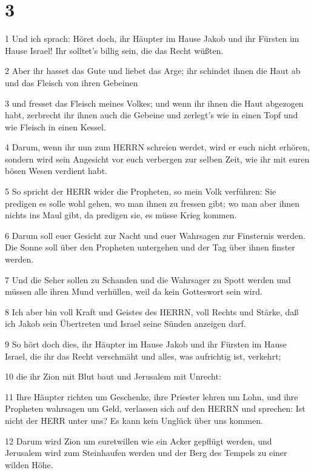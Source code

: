 \chapter{3}

\par 1 Und ich sprach: Höret doch, ihr Häupter im Hause Jakob und ihr Fürsten im Hause Israel! Ihr solltet's billig sein, die das Recht wüßten.
\par 2 Aber ihr hasset das Gute und liebet das Arge; ihr schindet ihnen die Haut ab und das Fleisch von ihren Gebeinen
\par 3 und fresset das Fleisch meines Volkes; und wenn ihr ihnen die Haut abgezogen habt, zerbrecht ihr ihnen auch die Gebeine und zerlegt's wie in einen Topf und wie Fleisch in einen Kessel.
\par 4 Darum, wenn ihr nun zum HERRN schreien werdet, wird er euch nicht erhören, sondern wird sein Angesicht vor euch verbergen zur selben Zeit, wie ihr mit euren bösen Wesen verdient habt.
\par 5 So spricht der HERR wider die Propheten, so mein Volk verführen: Sie predigen es solle wohl gehen, wo man ihnen zu fressen gibt; wo man aber ihnen nichts ins Maul gibt, da predigen sie, es müsse Krieg kommen.
\par 6 Darum soll euer Gesicht zur Nacht und euer Wahrsagen zur Finsternis werden. Die Sonne soll über den Propheten untergehen und der Tag über ihnen finster werden.
\par 7 Und die Seher sollen zu Schanden und die Wahrsager zu Spott werden und müssen alle ihren Mund verhüllen, weil da kein Gotteswort sein wird.
\par 8 Ich aber bin voll Kraft und Geistes des HERRN, voll Rechts und Stärke, daß ich Jakob sein Übertreten und Israel seine Sünden anzeigen darf.
\par 9 So hört doch dies, ihr Häupter im Hause Jakob und ihr Fürsten im Hause Israel, die ihr das Recht verschmäht und alles, was aufrichtig ist, verkehrt;
\par 10 die ihr Zion mit Blut baut und Jerusalem mit Unrecht:
\par 11 Ihre Häupter richten um Geschenke, ihre Priester lehren um Lohn, und ihre Propheten wahrsagen um Geld, verlassen sich auf den HERRN und sprechen: Ist nicht der HERR unter uns? Es kann kein Unglück über uns kommen.
\par 12 Darum wird Zion um euretwillen wie ein Acker gepflügt werden, und Jerusalem wird zum Steinhaufen werden und der Berg des Tempels zu einer wilden Höhe.

